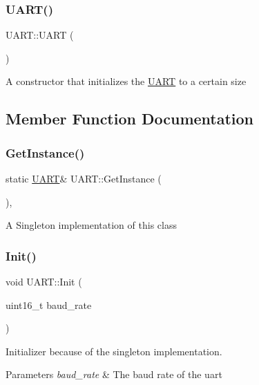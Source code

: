 \subsubsection{\texorpdfstring{U\+A\+R\+T()}{UART()}\hspace{0.1cm}{\footnotesize\ttfamily [2/2]}}
{\footnotesize\ttfamily U\+A\+R\+T\+::\+U\+A\+RT (\begin{DoxyParamCaption}{ }\end{DoxyParamCaption})\hspace{0.3cm}{\ttfamily [private]}}

A constructor that initializes the \hyperlink{class_u_a_r_t}{U\+A\+RT} to a certain size 

\subsection{Member Function Documentation}
\hypertarget{class_u_a_r_t_a745c8f35f3ca3ab6359cedda3e640777}{}\label{class_u_a_r_t_a745c8f35f3ca3ab6359cedda3e640777} 
\subsubsection{\texorpdfstring{Get\+Instance()}{GetInstance()}}
{\footnotesize\ttfamily static \hyperlink{class_u_a_r_t}{U\+A\+RT}\& U\+A\+R\+T\+::\+Get\+Instance (\begin{DoxyParamCaption}{ }\end{DoxyParamCaption})\hspace{0.3cm}{\ttfamily [inline]}, {\ttfamily [static]}}

A Singleton implementation of this class \hypertarget{class_u_a_r_t_aed659ee8bc31ba966144d1a522506a7b}{}\label{class_u_a_r_t_aed659ee8bc31ba966144d1a522506a7b} 
\subsubsection{\texorpdfstring{Init()}{Init()}}
{\footnotesize\ttfamily void U\+A\+R\+T\+::\+Init (\begin{DoxyParamCaption}\item[{uint16\+\_\+t}]{baud\+\_\+rate }\end{DoxyParamCaption})}

Initializer because of the singleton implementation. 
\begin{DoxyParams}{Parameters}
{\em baud\+\_\+rate} & The baud rate of the uart \\
\hline
\end{DoxyParams}
\hypertarget{class_u_a_r_t_a843ab7fc20f5ce5f030d2ca5ee98d6b6}{}\label{class_u_a_r_t_a843ab7fc20f5ce5f030d2ca5ee98d6b6} 
